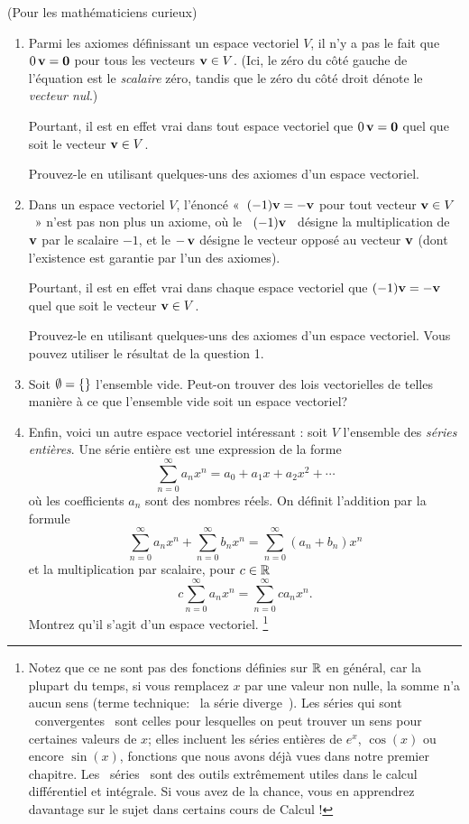 \begin{prob} \label{prob04.14} (Pour les
mathématiciens curieux)\label{exVS}

\begin{enumerate}
\item
  Parmi les axiomes définissant un espace vectoriel $V$, il n'y a pas le fait
  que $0 \,\mathbf{v} ={\bold 0}$ pour tous les vecteurs $\mathbf{v}\in V$. (Ici, le
  zéro du côté gauche de l'équation est
  le {\emph{scalaire}} zéro, tandis que le zéro du côté droit dénote le {\emph{vecteur nul}}.)

  Pourtant, il est en effet vrai dans tout espace vectoriel que
  $0\, \mathbf{v} ={\bold 0}$ quel que soit le vecteur $\mathbf{v}\in V$.

  Prouvez-le en utilisant quelques-uns des axiomes d'un espace
  vectoriel.
\item
  Dans un espace vectoriel $V$, l'énoncé «~$(-1) \mathbf{v} =-\mathbf{v}$ pour tout vecteur $\mathbf{v}\in V$~» n'est pas non plus un axiome, où
  le ~$(-1) \mathbf{v}$~ désigne la multiplication de $\mathbf{v}$ par le scalaire $-1$, et
  le  $-\, \mathbf{v}$  désigne le vecteur opposé au vecteur
  $\mathbf{v}$ (dont l'existence est garantie par l'un des axiomes).

  Pourtant, il est en effet vrai dans chaque espace vectoriel que
  $(-1) \mathbf{v} =-\mathbf{v}$ quel que soit le vecteur $\mathbf{v}\in V$.

  Prouvez-le en utilisant quelques-uns des axiomes d'un espace
  vectoriel. Vous pouvez utiliser le résultat de la question 1.
\item
  Soit $\emptyset=\{\}$ l'ensemble vide. Peut-on trouver des lois vectorielles de telles manière à ce que l'ensemble vide soit un espace vectoriel?
\item
  Enfin, voici un autre espace vectoriel intéressant : soit $V$  l'ensemble des {\emph{séries entières}}. Une série entière est une expression de la forme
  \[\sum_{n=0}^\infty a_nx^n = a_0 + a_1x+ a_2x^2 + \cdots\] où les
  coefficients $a_n$ sont des nombres réels. 
On définit l'addition par la formule
  \[\sum_{n=0}^\infty a_nx^n + \sum_{n=0}^\infty b_n x^n =  \sum_{n=0}^\infty (a_n+b_n) x^n\]
  et la multiplication par scalaire, pour $c\in\mathbb{R}$
  \[c  \sum_{n=0}^\infty a_n x^n =  \sum_{n=0}^\infty ca_n x^n.\]
  Montrez qu'il s'agit d'un espace vectoriel. \footnote{Notez que ce ne sont pas des fonctions définies sur $\mathbb{R}$ en général, car la plupart du
    temps, si vous remplacez $x$ par une valeur non nulle, la somme n'a aucun sens (terme technique: ~la série diverge~). Les séries qui sont ~convergentes~  sont celles pour lesquelles
    on peut trouver un sens pour certaines valeurs de $x$; elles incluent les séries entières de $e^x$, $\cos(x)$ ou encore $\sin(x)$, fonctions que nous avons déjà
  vues dans notre premier chapitre. Les ~séries~ sont des
    outils extrêmement utiles dans le calcul différentiel et intégrale. Si vous avez de la chance, vous en apprendrez
    davantage sur le sujet dans certains cours de Calcul !}
\end{enumerate}
\end{prob}

